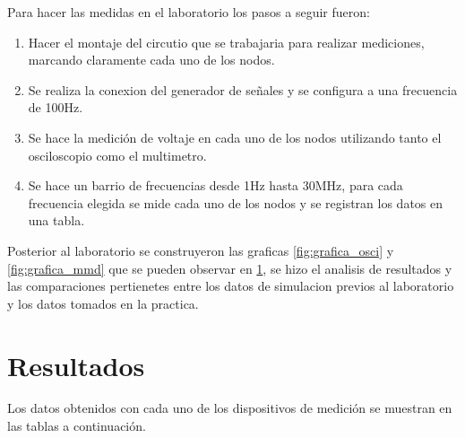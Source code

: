 \documentclass[conference]{IEEEtran}
\begin{document}
Para hacer las medidas en el laboratorio los pasos a seguir fueron:
\begin{enumerate}
    \item Hacer el montaje del circutio que se trabajaria para realizar mediciones, marcando claramente cada uno de los nodos. 
    \item Se realiza la conexion del generador de señales y se configura a una frecuencia de 100Hz.
    \item Se hace la medición de voltaje en cada uno de los nodos utilizando tanto el osciloscopio como el multimetro.
    \item Se hace un barrio de frecuencias desde 1Hz hasta 30MHz, para cada frecuencia elegida se mide cada uno de los nodos y se registran los datos en una tabla.
\end{enumerate}

Posterior al laboratorio se construyeron las graficas \ref{fig:grafica_osci} y \ref{fig:grafica_mmd} que se pueden observar en \ref{sec:Res}, se hizo el analisis de resultados y las comparaciones pertienetes entre los datos de simulacion previos al laboratorio y los datos tomados en la practica.



\section{Resultados}
\label{sec:Res}
Los datos obtenidos con cada uno de los dispositivos de medición se muestran en las tablas a continuación.
\end{document}
